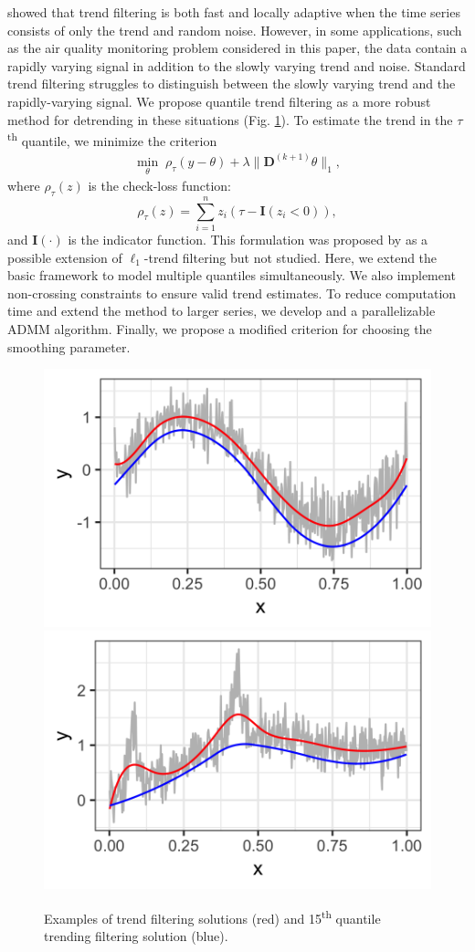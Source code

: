 \documentclass[12pt]{article}
\begin{document}
	\cite{Tib2014} showed that trend filtering is both fast and locally adaptive when the time series consists of only the trend and random noise. However, in some applications, such as the air quality monitoring problem considered in this paper, the data contain a rapidly varying signal in addition to the slowly varying trend and noise. Standard trend filtering struggles to distinguish between the slowly varying trend and the rapidly-varying signal. We propose quantile trend filtering as a more robust method for detrending in these situations (Fig. \ref{fig:trendfilter}). To estimate the trend in the $\tau$\textsuperscript{th} quantile, we minimize the criterion	
	\begin{eqnarray}
		\label{eq:quantile_trend}
		\underset{\theta}{\min}\; \rho_\tau(y - \theta) + \lambda \lVert \mathbf{D}^{(k+1)} \theta \rVert_1,
	\end{eqnarray}	
	where $\rho_\tau(z)$ is the check-loss function: 
	\begin{equation}
		\label{eq:checkloss}
		\rho_{\tau}(z) = \sum_{i=1}^n z_i(\tau-\mathbf{I}(z_i<0)),
	\end{equation}
	 and $\mathbf{I}(\cdot) $ is the indicator function. This formulation was proposed by \cite{Kim2009} as a possible extension of $\ell_1$-trend filtering but not studied. Here, we extend the basic framework to model multiple quantiles simultaneously. We also implement non-crossing constraints to ensure valid trend estimates. To reduce computation time and extend the method to larger series, we develop and a parallelizable ADMM algorithm. Finally, we propose a modified criterion for choosing the smoothing parameter. 
		   	
	\begin{figure}
		\centering
		\includegraphics[width = 0.45\linewidth]{Figures/trend_filter_eg1.png}
		\includegraphics[width = 0.45\linewidth]{Figures/trend_filter_eg2.png}
		\caption{Examples of trend filtering solutions (red) and 15\textsuperscript{th} quantile trending filtering solution (blue).}
		\label{fig:trendfilter}
	\end{figure}
	 
\end{document}
